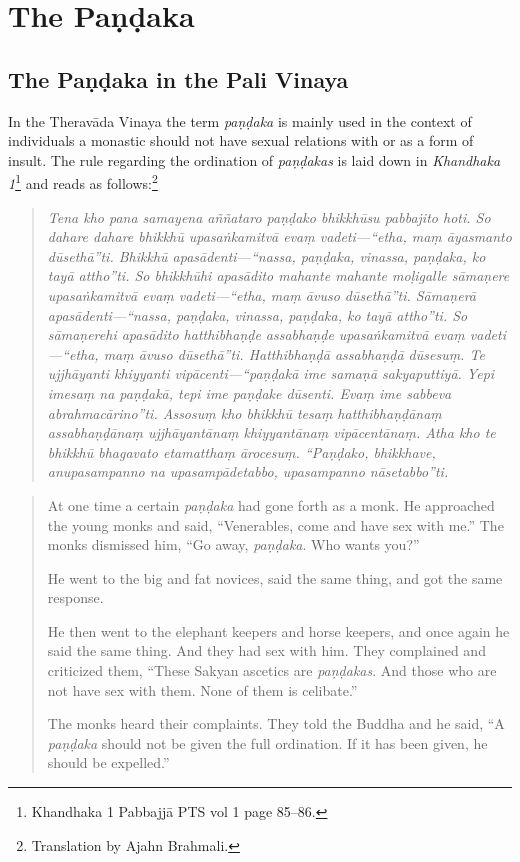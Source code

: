 \section{The Paṇḍaka}

\subsection{The Paṇḍaka in the Pali Vinaya}
In the Theravāda Vinaya the term {\em paṇḍaka} is mainly used in the context of individuals a monastic should not have sexual relations with or as a form of insult. The rule regarding the ordination of {\em paṇḍakas} is laid down in {\em Khandhaka 1}\footnote{Khandhaka 1 Pabbajjā PTS vol 1 page 85–86.} and reads as follows:\footnote{Translation by Ajahn Brahmali.}

\begin{quote}
{\em Tena kho pana samayena aññataro paṇḍako bhikkhūsu pabbajito hoti. So dahare dahare bhikkhū upasaṅkamitvā evaṃ vadeti—“etha, maṃ āyasmanto dūsethā”ti. Bhikkhū apasādenti—“nassa, paṇḍaka, vinassa, paṇḍaka, ko tayā attho”ti. So bhikkhūhi apasādito mahante mahante moḷigalle sāmaṇere upasaṅkamitvā evaṃ vadeti—“etha, maṃ āvuso dūsethā”ti. Sāmaṇerā apasādenti—“nassa, paṇḍaka, vinassa, paṇḍaka, ko tayā attho”ti. So sāmaṇerehi apasādito hatthibhaṇḍe assabhaṇḍe upasaṅkamitvā evaṃ vadeti—“etha, maṃ āvuso dūsethā”ti. Hatthibhaṇḍā assabhaṇḍā dūsesuṃ. Te ujjhāyanti khiyyanti vipācenti—“paṇḍakā ime samaṇā sakyaputtiyā. Yepi imesaṃ na paṇḍakā, tepi ime paṇḍake dūsenti. Evaṃ ime sabbeva abrahmacārino”ti. Assosuṃ kho bhikkhū tesaṃ hatthibhaṇḍānaṃ assabhaṇḍānaṃ ujjhāyantānaṃ khiyyantānaṃ vipācentānaṃ. Atha kho te bhikkhū bhagavato etamatthaṃ ārocesuṃ. “Paṇḍako, bhikkhave, anupasampanno na upasampādetabbo, upasampanno nāsetabbo”ti.}
\end{quote}

\begin{quote}
At one time a certain {\em paṇḍaka} had gone forth as a monk. He approached the young monks and said, “Venerables, come and have sex with me.” The monks dismissed him, “Go away, {\em paṇḍaka}. Who wants you?”

He went to the big and fat novices, said the same thing, and got the same response.

He then went to the elephant keepers and horse keepers, and once again he said the same thing. And they had sex with him. They complained and criticized them, “These Sakyan ascetics are {\em paṇḍakas}. And those who are not have sex with them. None of them is celibate.”

The monks heard their complaints. They told the Buddha and he said, “A {\em paṇḍaka} should not be given the full ordination. If it has been given, he should be expelled.”
\end{quote}

